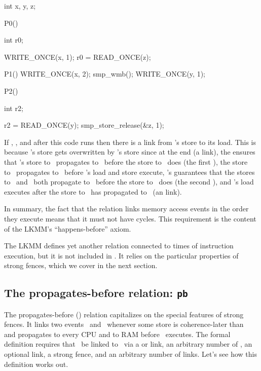 \begin{VerbatimU}
	int x, y, z;

	P0()
	{
		int r0;

		WRITE_ONCE(x, 1);
		r0 = READ_ONCE(z);
	}

	P1()
	{
		WRITE_ONCE(x, 2);
		smp_wmb();
		WRITE_ONCE(y, 1);
	}

	P2()
	{
		int r2;

		r2 = READ_ONCE(y);
		smp_store_release(&z, 1);
	}
\end{VerbatimU}

If , , and  after this code runs
then there is a  link from 's store to its load.
This is because 's store gets overwritten by 's store
since  at the end (a  link), the 
ensures that 's store to~ propagates to~ before the
store to~ does (the first ), the store to~
propagates to~ before 's load and store execute,
's  guarantees that the stores to~
and~ both propagate to~ before the store to~ does
(the second ), and 's load executes after the
store to~ has propagated to~ (an  link).

In summary, the fact that the  relation links memory access events
in the order they execute means that it must not have cycles.
This requirement is the content of the LKMM's ``happens-before'' axiom.

The LKMM defines yet another relation connected to times of
instruction execution, but it is not included in .
It relies on the particular properties of strong fences, which we
cover in the next section.


\subsection{The propagates-before relation: \texttt{pb}}
\label{sec:docs:explanation:The Propagates-before Relation: pb}

The propagates-before () relation capitalizes on the special
features of strong fences.
It links two events~ and~ whenever some store is
coherence-later than~ and propagates to every CPU and to RAM
before ~executes.
The formal definition requires that ~be linked to~
via a  or  link, an arbitrary number of
, an optional  link, a strong fence, and
an arbitrary number of  links.
Let's see how this definition works out.

